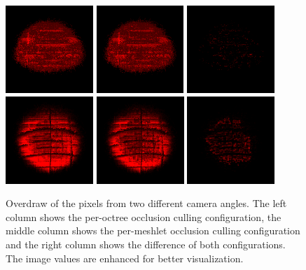 \begin{figure}[!htb]
  \centering
  \includegraphics[height=125px]{images/graphics/overdraw-hairball1-pooc.png}
  \includegraphics[height=125px]{images/graphics/overdraw-hairball1-pmoc.png}
  \includegraphics[height=125px]{images/graphics/overdraw-hairball1-diff.png}
  \includegraphics[height=125px]{images/graphics/overdraw-hairball2-pooc.png}
  \includegraphics[height=125px]{images/graphics/overdraw-hairball2-pmoc.png}
  \includegraphics[height=125px]{images/graphics/overdraw-hairball2-diff.png}
  \caption{Overdraw of the pixels from two different camera angles. The left column 
  shows the per-octree occlusion culling configuration, the middle column shows the 
  per-meshlet occlusion culling configuration and the right column shows the difference 
  of both configurations. The image values are enhanced for better visualization.}
  \label{fig:hairball-overdraw}
\end{figure}

